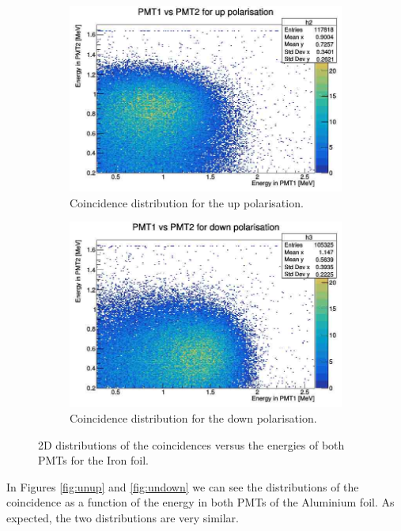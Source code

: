\documentclass[10pt,swedish, openany]{book}
\begin{document}
\begin{figure}[H]
\begin{subfigure}{.5\textwidth}
  \centering
  \includegraphics[width=.99\linewidth]{UPPolX.jpg}  
  \caption{Coincidence distribution for the up polarisation.}
  \label{fig:Polup}
\end{subfigure}
\begin{subfigure}{.5\textwidth}
  \centering
  \includegraphics[width=.99\linewidth]{downPolX.jpg}  
  \caption{Coincidence distribution for the down polarisation.}
  \label{fig:Poldown}
\end{subfigure}
\caption{2D distributions of the coincidences versus the energies of both PMTs for the Iron foil.}
\label{fig:fig}
\end{figure}

In Figures \ref{fig:unup} and \ref{fig:undown} we can see the distributions of the coincidence as a function of the energy in both PMTs of the Aluminium foil. As expected, the two distributions are very similar.
\end{document}
